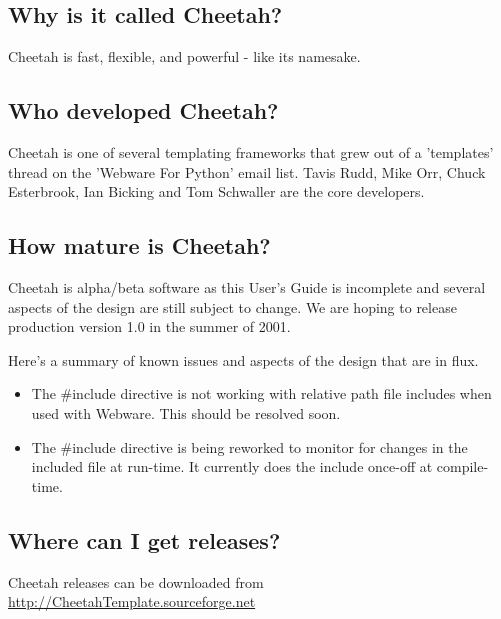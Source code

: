 \subsection{Why is it called Cheetah?}
\label{intro.name}

Cheetah is fast, flexible, and powerful - like its namesake. 


\subsection{Who developed Cheetah?}
\label{intro.developers}

Cheetah is one of several templating frameworks that grew out of a 'templates'
thread on the 'Webware For Python' email list.  Tavis Rudd, Mike Orr, Chuck
Esterbrook, Ian Bicking and Tom Schwaller are the core developers.

\subsection{How mature is Cheetah?}
\label{intro.mature}

Cheetah is alpha/beta software as this User's Guide is incomplete and several
aspects of the design are still subject to change. We are hoping to release
production version 1.0 in the summer of 2001.

Here's a summary of known issues and aspects of the design that are in flux.
\begin{itemize}
\item The \#include directive is not working with relative path file includes
     when used with Webware. This should be resolved soon.
\item The \#include directive is being reworked to monitor for changes in the
     included file at run-time. It currently does the include once-off at
     compile-time.
\end{itemize}

\subsection{Where can I get releases?}
\label{intro.releases}

Cheetah releases can be downloaded from
\url{http://CheetahTemplate.sourceforge.net}

